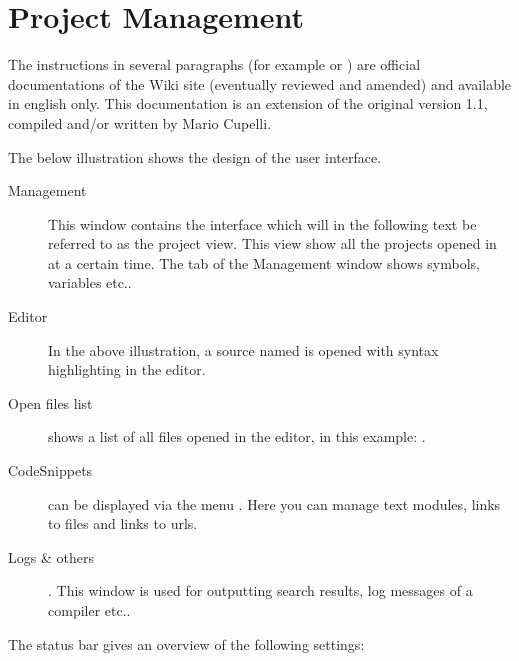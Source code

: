 \chapter{\codeblocks Project Management}

The instructions in several paragraphs (for example  or ) are official documentations of the \codeblocks Wiki site (eventually reviewed and amended) and available in english only.
This documentation is an extension of the original version 1.1, compiled and/or written by Mario Cupelli.

The below illustration shows the design of the \codeblocks user interface.


\begin{description}
\item[Management] This window contains the interface  which will in the following text be referred to as the project view. This view show all the projects opened in \codeblocks at a certain time. The  tab of the Management window shows symbols, variables etc..
\item[Editor] In the above illustration, a source named  is opened with syntax highlighting in the editor.
\item[Open files list] shows a list of all files opened in the editor, in this example: .
\item[CodeSnippets] can be displayed via the menu . Here you can manage text modules, links to files and links to urls.
\item[Logs \& others]. This window is used for outputting search results, log messages of a compiler etc..
\end{description}

The status bar gives an overview of the following settings:

